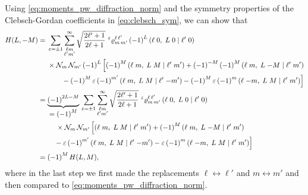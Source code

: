 Using \cref{eq:moments_pw_diffraction_norm} and the symmetry
properties of the Clebsch-Gordan coefficients in
\cref{eq:clebsch_sym}, we can show that
\begin{align}
  H(L, -M)
  ={}& \begin{multlined}[t][0.8\textwidth]
    \sum_{\refl = \pm 1} \sum_{\substack{\ell m \\ \ell' m'}}^\infty
    \sqrt{\frac{2 \ell' + 1}{2 \ell + 1}}\,
    \prescript{\refl}{}{\varrho}^{\ell\, \ell'}_{m\, m'}\, {(-1)}^L\, \clebsch{\ell}{0}{L}{0}{\ell'}{0} \\
    \times \mathcal{N}_m\, \mathcal{N}_{m'}\, {(-1)}^L\, \Big[
      {(-1)}^M\, \clebsch{\ell}{m}{L}{M}{\ell'}{m'}
      + {(-1)}^{-M}\, {(-1)}^M\, \clebsch{\ell}{m}{L}{-M}{\ell'}{m'} \\
      - {(-1)}^M\, \refl\, {(-1)}^{m'}\, \clebsch{\ell}{m}{L}{M}{\ell'}{-m'}
      - {(-1)}^M\, \refl\, {(-1)}^m\, \clebsch{\ell}{-m}{L}{M}{\ell'}{m'} \Big]
  \end{multlined} \notag
  \\
  ={}& \begin{multlined}[t][0.8\textwidth]
    \dUnderbrace{{(-1)}^{2 L - M}}{= {(-1)}^M}\, \sum_{\refl = \pm 1} \sum_{\substack{\ell m \\ \ell' m'}}^\infty
    \sqrt{\frac{2 \ell' + 1}{2 \ell + 1}}\,
    \prescript{\refl}{}{\varrho}^{\ell\, \ell'}_{m\, m'}\, \clebsch{\ell}{0}{L}{0}{\ell'}{0} \\
    \times \mathcal{N}_m\, \mathcal{N}_{m'}\, \Big[
      \clebsch{\ell}{m}{L}{M}{\ell'}{m'}
      + {(-1)}^{M}\, \clebsch{\ell}{m}{L}{-M}{\ell'}{m'} \\
      - \refl\, {(-1)}^{m'}\, \clebsch{\ell}{m}{L}{M}{\ell'}{-m'}
      - \refl\, {(-1)}^m\, \clebsch{\ell}{-m}{L}{M}{\ell'}{m'} \Big]
  \end{multlined} \notag
  \\
  \label{eq:diffraction_moment_sym_2}
  ={}& {(-1)}^M\, H(L, M),
\end{align}
where in the last step we first made the replacements $\ell
\leftrightarrow \ell'$ and $m \leftrightarrow m'$ and then compared to
\cref{eq:moments_pw_diffraction_norm}.

